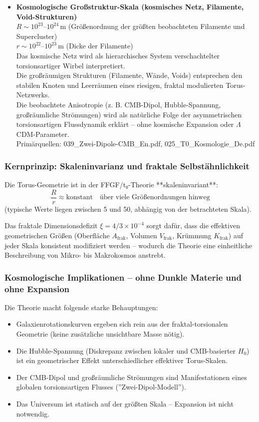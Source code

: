 \begin{itemize}
		\item \textbf{Kosmologische Großstruktur-Skala (kosmisches Netz, Filamente, Void-Strukturen)} \\
		$R \sim 10^{23}$–$10^{24}\,\text{m}$ (Größenordnung der größten beobachteten Filamente und Supercluster) \\
		$r \sim 10^{22}$–$10^{23}\,\text{m}$ (Dicke der Filamente) \\
		Das kosmische Netz wird als hierarchisches System verschachtelter torsionsartiger Wirbel interpretiert. \\
		Die großräumigen Strukturen (Filamente, Wände, Voids) entsprechen den stabilen Knoten und Leerräumen eines riesigen, fraktal modulierten Torus-Netzwerks. \\
		Die beobachtete Anisotropie (z. B. CMB-Dipol, Hubble-Spannung, großräumliche Strömungen) wird als natürliche Folge der asymmetrischen torsionsartigen Flussdynamik erklärt – ohne kosmische Expansion oder $\Lambda$CDM-Parameter. \\
		Primärquellen: 039\_Zwei-Dipole-CMB\_En.pdf, 025\_T0\_Kosmologie\_De.pdf
	\end{itemize}
	
	\subsubsection{Kernprinzip: Skaleninvarianz und fraktale Selbstähnlichkeit}
	
	Die Torus-Geometrie ist in der FFGF/t₀-Theorie **skaleninvariant**:
	\[
	\frac{R}{r} \approx \text{konstant} \quad \text{über viele Größenordnungen hinweg}
	\]
	(typische Werte liegen zwischen 5 und 50, abhängig von der betrachteten Skala).
	
	Das fraktale Dimensionsdefizit $\xi = 4/3 \times 10^{-4}$ sorgt dafür, dass die effektiven geometrischen Größen (Oberfläche $A_{\text{frak}}$, Volumen $V_{\text{frak}}$, Krümmung $K_{\text{frak}}$) auf jeder Skala konsistent modifiziert werden – wodurch die Theorie eine einheitliche Beschreibung von Mikro- bis Makrokosmos anstrebt.
	
	\subsubsection{Kosmologische Implikationen – ohne Dunkle Materie und ohne Expansion}
	
	Die Theorie macht folgende starke Behauptungen:
	\begin{itemize}
		\item Galaxienrotationskurven ergeben sich rein aus der fraktal-torsionalen Geometrie (keine zusätzliche unsichtbare Masse nötig).
		\item Die Hubble-Spannung (Diskrepanz zwischen lokaler und CMB-basierter $H_0$) ist ein geometrischer Effekt unterschiedlicher effektiver Torus-Skalen.
		\item Der CMB-Dipol und großräumliche Strömungen sind Manifestationen eines globalen torsionsartigen Flusses (''Zwei-Dipol-Modell'').
		\item Das Universum ist statisch auf der größten Skala – Expansion ist nicht notwendig.
	\end{itemize}
	
